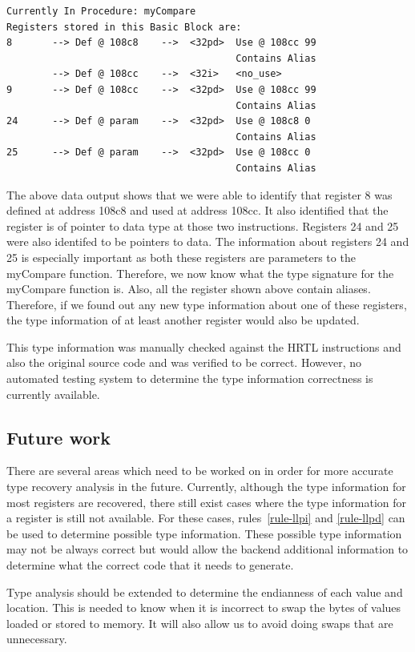 \begin{verbatim}
Currently In Procedure: myCompare
Registers stored in this Basic Block are:
8       --> Def @ 108c8    -->  <32pd>  Use @ 108cc 99
                                        Contains Alias
        --> Def @ 108cc    -->  <32i>   <no_use>
9       --> Def @ 108cc    -->  <32pd>  Use @ 108cc 99
                                        Contains Alias
24      --> Def @ param    -->  <32pd>  Use @ 108c8 0
                                        Contains Alias
25      --> Def @ param    -->  <32pd>  Use @ 108cc 0
                                        Contains Alias
\end{verbatim}

The above data output shows that we were able to identify that register 8 was
defined at address 108c8 and used at address 108cc. It also identified that
the register is of pointer to data type at those two instructions. Registers 24
and 25 were also identifed to be pointers to data. The information about
registers 24 and 25 is especially important as both these registers are 
parameters to the myCompare function. Therefore, we now know what the type 
signature for the myCompare function is. Also, all the register shown above
contain aliases. Therefore, if we found out any new type information about one
of these registers, the type information of at least another register would
also be updated.

This type information was manually checked against the HRTL instructions and 
also the original source code and was verified to be correct. However, no 
automated testing system to determine the type information correctness is 
currently available.


\subsection{Future work}
There are several areas which need to be worked on in order for more accurate
type recovery analysis in the future. Currently, although the type information 
for most registers are recovered, there still exist cases where the type 
information for a register is still not available. For these cases, 
rules~\ref{rule-llpi} and \ref{rule-llpd} can be used to determine possible 
type information. These possible type information may not be always correct 
but would allow the backend additional information to determine what the 
correct code that it needs to generate.

Type analysis should be extended
to determine the endianness of each value and location.
This is needed to know when it is incorrect to swap the bytes
of values loaded or stored to memory.
It will also allow us to avoid doing swaps that are unnecessary.

